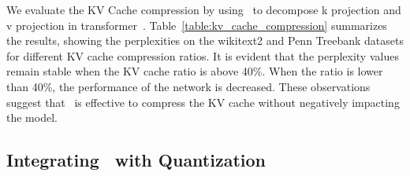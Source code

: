 \begin{table}[tb]
\centering
\caption{Performance under different KV cache compression ratio.}
\label{table:kv_cache_compression}
\vspace{-0.1in}
\end{table}

We evaluate the KV Cache compression by using \asvd~to decompose k projection and v projection in transformer~\citep{vaswani2017attention}.
Table~\ref{table:kv_cache_compression} summarizes the results, showing the perplexities on the wikitext2 and Penn Treebank datasets for different KV cache compression ratios. It is evident that the perplexity values remain stable when the KV cache ratio is above 40\%. 
When the ratio is lower than 40\%, the performance of the network is decreased.
These observations suggest that \asvd~is effective to compress the KV cache without negatively impacting the model. 

\subsection{Integrating \asvd~with Quantization}
\label{sec:quantization}

